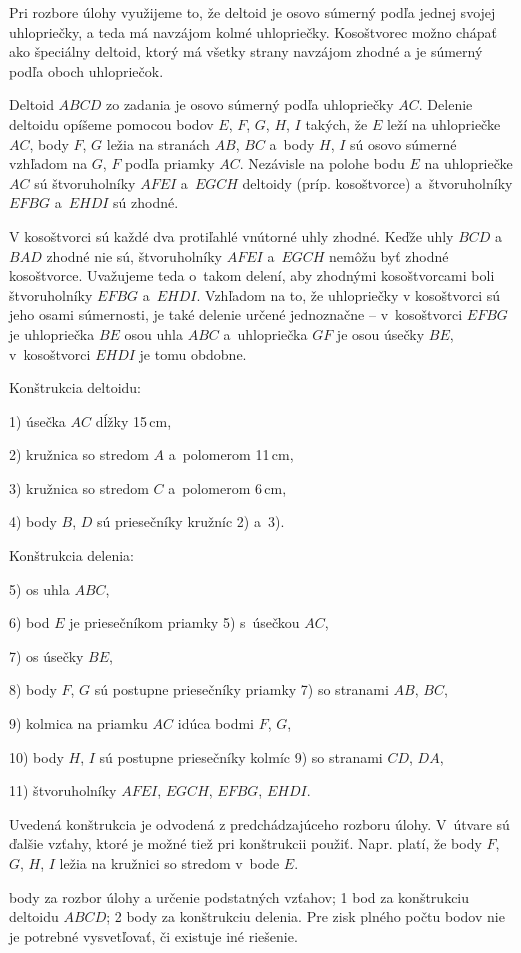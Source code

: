 {%
Pri rozbore úlohy využijeme to, že deltoid je osovo súmerný podľa jednej svojej uhlopriečky, a teda má navzájom kolmé uhlopriečky.
Kosoštvorec možno chápať ako špeciálny {deltoid}, ktorý má všetky strany navzájom zhodné a je súmerný podľa oboch uhlopriečok.

Deltoid $ABCD$ zo zadania je osovo súmerný podľa uhlopriečky $AC$.
Delenie deltoidu opíšeme pomocou bodov $E$, $F$, $G$, $H$, $I$ takých, že $E$ leží na uhlopriečke $AC$, body $F$, $G$ ležia na stranách $AB$, $BC$ a~body $H$, $I$ sú osovo súmerné vzhľadom na $G$, $F$ podľa priamky $AC$.
Nezávisle na polohe bodu $E$ na uhlopriečke $AC$ sú štvoruholníky $AFEI$ a~$EGCH$ deltoidy (príp. kosoštvorce) a~štvoruholníky $EFBG$ a~$EHDI$ sú zhodné.
%

V kosoštvorci sú každé dva protiľahlé vnútorné uhly zhodné.
Keďže uhly $BCD$ a~$BAD$ zhodné nie sú, štvoruholníky $AFEI$ a~$EGCH$ nemôžu byť zhodné kosoštvorce.
Uvažujeme teda o~takom delení, aby zhodnými kosoštvorcami boli štvoruholníky $EFBG$ a~$EHDI$.
Vzhľadom na to, že uhlopriečky v kosoštvorci sú jeho osami súmernosti, je také delenie určené jednoznačne --
v~kosoštvorci $EFBG$ je uhlopriečka $BE$ osou uhla $ABC$ a~uhlopriečka $GF$ je osou úsečky $BE$, v~kosoštvorci $EHDI$ je tomu obdobne.
%

\smallskip
Konštrukcia deltoidu:
    \item{1)} úsečka $AC$ dĺžky 15\,cm,
    \item{2)} kružnica so stredom $A$ a~polomerom 11\,cm,
    \item{3)} kružnica so stredom $C$ a~polomerom 6\,cm,
    \item{4)} body $B$, $D$ sú priesečníky kružníc 2) a~3).
%
\smallskip

Konštrukcia delenia:
    \item{5)} os uhla $ABC$,
    \item{6)} bod $E$ je priesečníkom priamky 5) s~úsečkou $AC$,
    \item{7)} os úsečky $BE$,
    \item{8)} body $F$, $G$ sú postupne priesečníky priamky 7) so stranami $AB$, $BC$,
    \item{9)} kolmica na priamku $AC$ idúca bodmi $F$, $G$,
    \item{10)} body $H$, $I$ sú postupne priesečníky kolmíc 9) so stranami $CD$, $DA$,
    \item{11)} štvoruholníky $AFEI$, $EGCH$, $EFBG$, $EHDI$.
%

\poznamka
Uvedená konštrukcia je odvodená z predchádzajúceho rozboru úlohy.
V~útvare sú ďalšie vzťahy, ktoré je možné tiež pri konštrukcii použiť.
Napr. platí, že body $F$, $G$, $H$, $I$ ležia na kružnici so stredom v~bode $E$.

 body za rozbor úlohy a určenie podstatných vzťahov; 1 bod za konštrukciu deltoidu $ABCD$; 2 body za konštrukciu delenia. Pre zisk plného počtu
bodov nie je potrebné vysvetľovať, či existuje iné riešenie.
\endhodnotenie

}

